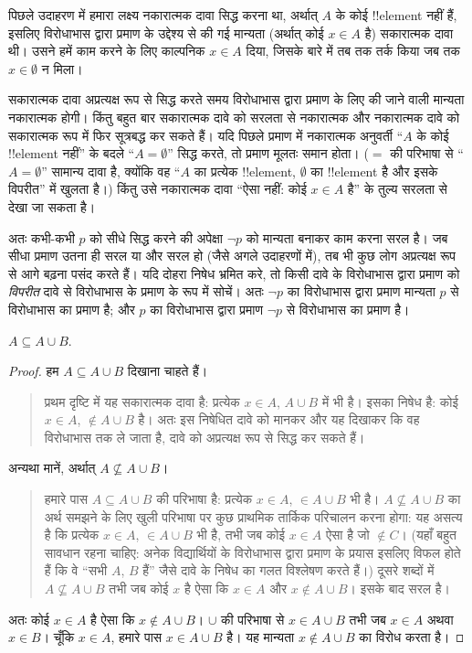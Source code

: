 \documentclass[../../../include/open-logic-section]{subfiles}
\begin{document}
पिछले उदाहरण में हमारा लक्ष्य नकारात्मक दावा सिद्ध करना था, अर्थात् $A$ के
कोई !!{element} नहीं हैं, इसलिए विरोधाभास द्वारा प्रमाण के उद्देश्य से की
गई मान्यता (अर्थात् कोई $x\in A$ है) सकारात्मक दावा थी। उसने हमें काम करने
के लिए काल्पनिक $x\in A$ दिया, जिसके बारे में तब तक तर्क किया जब तक
$x\in\emptyset$ न मिला।

सकारात्मक दावा अप्रत्यक्ष रूप से सिद्ध करते समय विरोधाभास द्वारा प्रमाण के
लिए की जाने वाली मान्यता नकारात्मक होगी। किंतु बहुत बार सकारात्मक दावे को
सरलता से नकारात्मक और नकारात्मक दावे को सकारात्मक रूप में फिर सूत्रबद्ध कर
सकते हैं। यदि पिछले प्रमाण में नकारात्मक अनुवर्ती ``$A$ के कोई !!{element}
नहीं'' के बदले ``$A=\emptyset$'' सिद्ध करते, तो प्रमाण मूलतः समान होता।
($=$ की परिभाषा से ``$A=\emptyset$'' सामान्य दावा है, क्योंकि वह ``$A$ का
प्रत्येक !!{element}, $\emptyset$ का !!{element} है और इसके विपरीत'' में
खुलता है।) किंतु उसे नकारात्मक दावा ``ऐसा नहीं: कोई $x\in A$ है'' के तुल्य
सरलता से देखा जा सकता है।

अतः कभी-कभी $p$ को सीधे सिद्ध करने की अपेक्षा $\lnot p$ को मान्यता बनाकर
काम करना सरल है। जब सीधा प्रमाण उतना ही सरल या और सरल हो (जैसे अगले
उदाहरणों में), तब भी कुछ लोग अप्रत्यक्ष रूप से आगे बढ़ना पसंद करते हैं। यदि
दोहरा निषेध भ्रमित करे, तो किसी दावे के विरोधाभास द्वारा प्रमाण को
\emph{विपरीत} दावे से विरोधाभास के प्रमाण के रूप में सोचें। अतः $\lnot p$
का विरोधाभास द्वारा प्रमाण मान्यता $p$ से विरोधाभास का प्रमाण है; और $p$ का
विरोधाभास द्वारा प्रमाण $\lnot p$ से विरोधाभास का प्रमाण है।

\begin{prop}
$A \subseteq A \cup B$.
\end{prop}

\begin{proof}
  हम $A\subseteq A\cup B$ दिखाना चाहते हैं।
  \begin{quote}
    प्रथम दृष्टि में यह सकारात्मक दावा है: प्रत्येक $x\in A$, $A\cup B$ में
    भी है। इसका निषेध है: कोई $x\in A$, $\notin A\cup B$ है। अतः इस निषेधित
    दावे को मानकर और यह दिखाकर कि वह विरोधाभास तक ले जाता है, दावे को
    अप्रत्यक्ष रूप से सिद्ध कर सकते हैं।
    \end{quote}
  अन्यथा मानें, अर्थात् $A\nsubseteq A\cup B$।
  \begin{quote}
    हमारे पास $A\subseteq A\cup B$ की परिभाषा है: प्रत्येक $x\in A$,
    $\in A\cup B$ भी है। $A\nsubseteq A\cup B$ का अर्थ समझने के लिए खुली
    परिभाषा पर कुछ प्राथमिक तार्किक परिचालन करना होगा: यह असत्य है कि
    प्रत्येक $x\in A$, $\in A\cup B$ भी है, तभी जब कोई $x\in A$ ऐसा है जो
    $\notin C$। (यहाँ बहुत सावधान रहना चाहिए: अनेक विद्यार्थियों के
    विरोधाभास द्वारा प्रमाण के प्रयास इसलिए विफल होते हैं कि वे ``सभी $A$,
    $B$ हैं'' जैसे दावे के निषेध का गलत विश्लेषण करते हैं।) दूसरे शब्दों में
    $A\nsubseteq A\cup B$ तभी जब कोई $x$ है ऐसा कि $x\in A$ और
    $x\notin A\cup B$। इसके बाद सरल है।
  \end{quote}
  अतः कोई $x\in A$ है ऐसा कि $x\notin A\cup B$। $\cup$ की परिभाषा से
  $x\in A\cup B$ तभी जब $x\in A$ अथवा $x\in B$। चूँकि $x\in A$, हमारे
  पास $x\in A\cup B$ है। यह मान्यता $x\notin A\cup B$ का विरोध करता है।
\end{proof}
\end{document}
